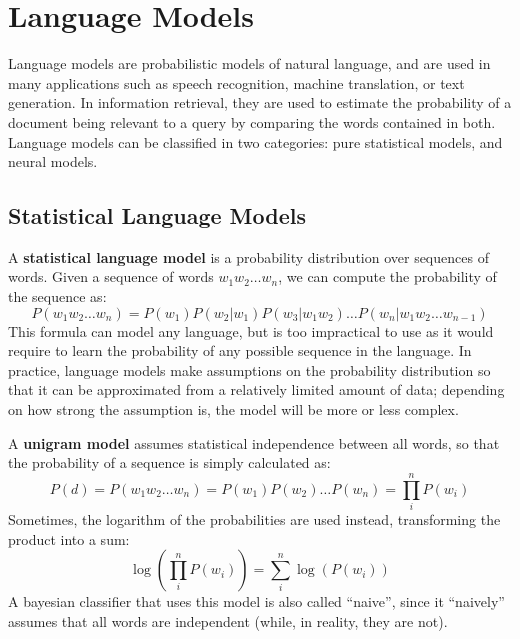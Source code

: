 \chapter{Language Models}

Language models are probabilistic models of natural language, and are used in many applications such as speech recognition, machine translation, or text generation. In information retrieval, they are used to estimate the probability of a document being relevant to a query by comparing the words contained in both. Language models can be classified in two categories: pure statistical models, and neural models.

\section{Statistical Language Models}
A \textbf{statistical language model} is a probability distribution over sequences of words. Given a sequence of words $w_1 w_2 \dots w_n$, we can compute the probability of the sequence as:
\begin{equation*}
    P(w_1 w_2 \dots w_n) = P(w_1) P(w_2 | w_1) P(w_3 | w_1 w_2) \dots P(w_n | w_1 w_2 \dots w_{n-1})
\end{equation*}
This formula can model any language, but is too impractical to use as it would require to learn the probability of any possible sequence in the language. In practice, language models make assumptions on the probability distribution so that it can be approximated from a relatively limited amount of data; depending on how strong the assumption is, the model will be more or less complex.

A \textbf{unigram model} assumes statistical independence between all words, so that the probability of a sequence is simply calculated as:
\begin{equation*}
    P(d) = P(w_1 w_2 \dots w_n) = P(w_1) P(w_2) \dots P(w_n) = \prod_i^n P(w_i)
\end{equation*}
Sometimes, the logarithm of the probabilities are used instead, transforming the product into a sum:
\begin{equation*}
    \log(\prod_i^n P(w_i)) = \sum_i^n \log(P(w_i))
\end{equation*}
A bayesian classifier that uses this model is also called ``naive'', since it ``naively'' assumes that all words are independent (while, in reality, they are not).

